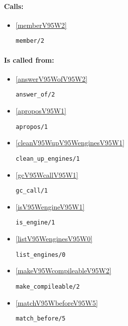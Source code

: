 \paragraph{Calls:} 
\begin{itemize}
\item \ref{memberV95W2} 
\begin{verbatim}
member/2
\end{verbatim}

\end{itemize}
\paragraph{Is called from:} 
\begin{itemize}
\item \ref{answerV95WofV95W2} 
\begin{verbatim}
answer_of/2
\end{verbatim}

\item \ref{aproposV95W1} 
\begin{verbatim}
apropos/1
\end{verbatim}

\item \ref{cleanV95WupV95WenginesV95W1} 
\begin{verbatim}
clean_up_engines/1
\end{verbatim}

\item \ref{gcV95WcallV95W1} 
\begin{verbatim}
gc_call/1
\end{verbatim}

\item \ref{isV95WengineV95W1} 
\begin{verbatim}
is_engine/1
\end{verbatim}

\item \ref{listV95WenginesV95W0} 
\begin{verbatim}
list_engines/0
\end{verbatim}

\item \ref{makeV95WcompileableV95W2} 
\begin{verbatim}
make_compileable/2
\end{verbatim}

\item \ref{matchV95WbeforeV95W5} 
\begin{verbatim}
match_before/5
\end{verbatim}


\end{itemize}
